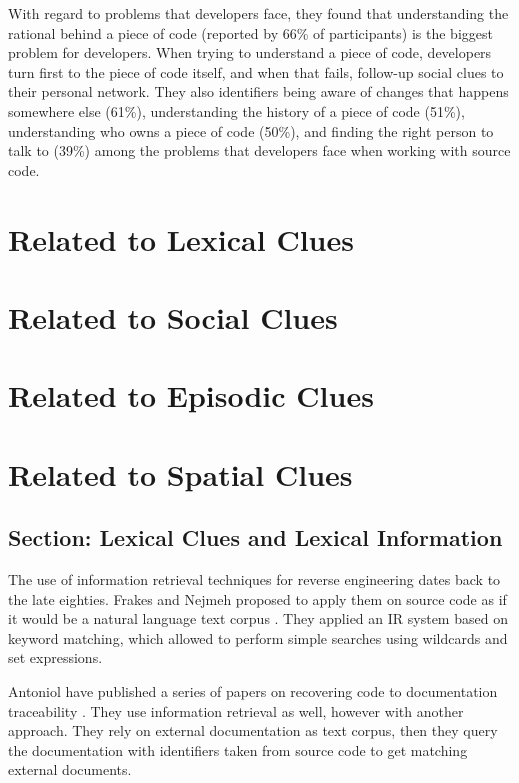With regard to problems that developers face, they found that understanding the rational behind a piece of code (reported by 66\% of participants) is the biggest problem for developers. When trying to understand a piece of code, developers turn first to the piece of code itself, and when that fails, follow-up social clues to their personal network. They also identifiers being aware of changes that happens somewhere else (61\%), understanding the history of a piece of code (51\%), understanding who owns a piece of code (50\%), and finding the right person to talk to (39\%) among the problems that developers face when working with source code.



\section{Related to Lexical Clues}

\section{Related to Social Clues}

\section{Related to Episodic Clues}

\section{Related to Spatial Clues}



\subsection{Section: Lexical Clues and Lexical Information}

The use of information retrieval techniques for reverse engineering dates back to the late eighties. Frakes and Nejmeh proposed to apply them on source code as if it would be a natural language text corpus \cite{Frak87a}. They applied an IR system based on keyword matching, which allowed to perform simple searches using wildcards and set expressions.

Antoniol \etal have published a series of papers on recovering code to documentation traceability \cite{Anto00c,Anto02b}. They use information retrieval as well, however with another approach. They rely on external documentation as text corpus, then they query the documentation with identifiers taken from source code to get matching external documents.

